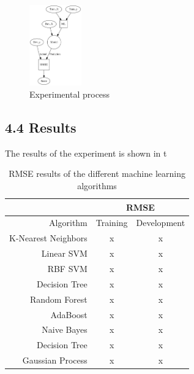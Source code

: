 \documentclass{article}
\begin{document}
	\begin{figure} [h]
 		\begin{center}
		\includegraphics[width=0.20\textwidth]{process}
  		\end{center}
  		\caption{Experimental process}
  		\label{process}
 	\end{figure}

	\subsection{4.4	Results}
	The results of the experiment is shown in t

	\begin{table}
		\begin{center}
			\begin{tabular}{ | r | c | c |}
			\hline
			& \multicolumn{2}{c|}{RMSE} \\ \hline
			Algorithm & Training & Development \\ \hline\hline
			K-Nearest Neighbors        & x & x \\ \hline
			Linear SVM                 & x & x \\ \hline
			RBF SVM                    & x & x \\ \hline
			Decision Tree              & x & x \\ \hline
			Random Forest              & x & x \\ \hline
			AdaBoost                   & x & x \\ \hline
			Naive Bayes                & x & x \\ \hline
			Decision Tree              & x & x \\ \hline
			Gaussian Process           & x & x \\ \hline
			\end{tabular}
		\end{center}
		\caption{RMSE results of the different machine learning algorithms}
		\label{rmse_results}
	\end{table}
 
\end{document}
